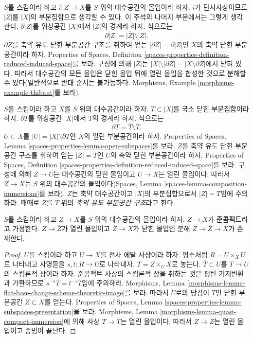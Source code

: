 \begin{remark}
\label{remark-immersion}
$S$를 스킴이라 하고 $i : Z \to X$를 $S$ 위의 대수공간의 몰입이라 하자.
$i$가 단사사상이므로 $|Z|$를 $|X|$의 부분집합으로 생각할 수 있다.
이 주석의 나머지 부분에서는 그렇게 생각한다.
$\partial |Z|$를 위상공간 $|X|$에서 $|Z|$의 경계라 하자.
식으로는
$$
\partial |Z| = \overline{|Z|} \setminus |Z|.
$$
$\partial Z$를 축약 유도 닫힌 부분공간 구조를 취하여 얻는
$|\partial Z| = \partial |Z|$인 $X$의 축약 닫힌 부분공간이라 하자.
Properties of Spaces, Definition
\ref{spaces-properties-definition-reduced-induced-space}를 보라.
구성에 의해 $|Z|$는
$|X| \setminus |\partial Z| = |X \setminus \partial Z|$에서 닫혀 있다.
따라서 대수공간의 모든 몰입은 닫힌 몰입 뒤에 열린 몰입을 합성한
것으로 분해할 수 있다(일반적으로 반대 순서는 불가능하다.
Morphisms, Example \ref{morphisms-example-thibaut}를 보라).
\end{remark}

\begin{remark}
\label{remark-space-structure-locally-closed-subset}
$S$를 스킴이라 하고 $X$를 $S$ 위의 대수공간이라 하자.
$T \subset |X|$를 국소 닫힌 부분집합이라 하자.
$\partial T$를 위상공간 $|X|$에서 $T$의 경계라 하자.
식으로는
$$
\partial T = \overline{T} \setminus T.
$$
$U \subset X$를 $|U| = |X| \setminus \partial T$인 $X$의 열린
부분공간이라 하자. Properties of Spaces, Lemma
\ref{spaces-properties-lemma-open-subspaces}를 보라.
$Z$를 축약 유도 닫힌 부분공간 구조를 취하여 얻는
$|Z| = T$인 $U$의 축약 닫힌 부분공간이라 하자.
Properties of Spaces, Definition
\ref{spaces-properties-definition-reduced-induced-space}를 보라.
구성에 의해 $Z \to U$는 대수공간의 닫힌 몰입이고
$U \to X$는 열린 몰입이다. 따라서 $Z \to X$는 $S$ 위의
대수공간의 몰입이다(Spaces, Lemma
\ref{spaces-lemma-composition-immersions}를 보라).
$Z$는 축약 대수공간이고 $|X|$의 부분집합으로서 $|Z| = T$임에
주의하라. 때때로 $Z$를 $T$ 위의 {\it 축약 유도 부분공간 구조}라고 한다.
\end{remark}

\begin{lemma}
\label{lemma-factor-the-other-way}
$S$를 스킴이라 하고 $Z \to X$를 $S$ 위의 대수공간의 몰입이라 하자.
$Z \to X$가 준콤팩트라고 가정한다.
$Z \to \overline{Z}$가 열린 몰입이고
$\overline{Z} \to X$가 닫힌 몰입인 분해
$Z \to \overline{Z} \to X$가 존재한다.
\end{lemma}

\begin{proof}
$U$를 스킴이라 하고 $U \to X$를 전사 에탈 사상이라 하자.
평소처럼 $R = U \times_X U$로 나타내고 사영들을
$s, t : R \to U$로 나타내자.
$T = Z \times_U X$로 놓는다.
$\overline{T} \subset U$를 $T \to U$의 스킴론적 상이라 하자.
준콤팩트 사상의 스킴론적 상을 취하는 것은 평탄 기저변환과 가환하므로
$s^{-1}\overline{T} = t^{-1}\overline{T}$임에 주의하라.
Morphisms, Lemma
\ref{morphisms-lemma-flat-base-change-scheme-theoretic-image}를 보라.
따라서 $U$로의 당김이 $\overline{T}$인 닫힌 부분공간
$\overline{Z} \subset X$를 얻는다. Properties of Spaces, Lemma
\ref{spaces-properties-lemma-subspaces-presentation}을 보라.
Morphisms, Lemma \ref{morphisms-lemma-quasi-compact-immersion}에 의해
사상 $T \to \overline{T}$는 열린 몰입이다.
따라서 $Z \to \overline{Z}$는 열린 몰입이고 증명이 끝난다.
\end{proof}

